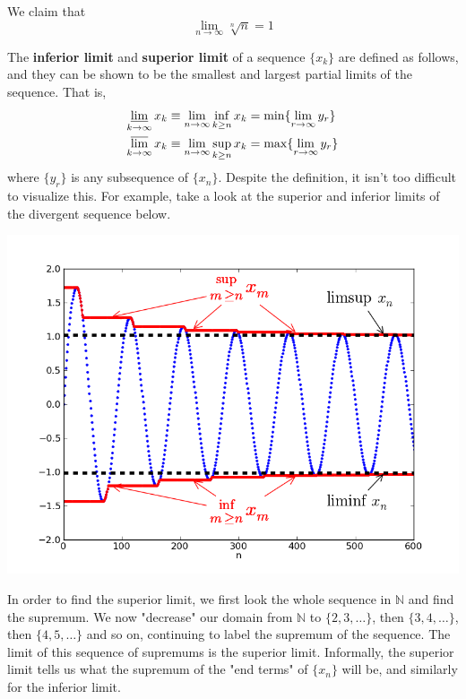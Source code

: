 \documentclass{article}
\begin{document}
    \begin{example}
      We claim that
      \begin{equation}
        \lim_{n\rightarrow \infty} \sqrt[n]{n} = 1
      \end{equation}
    \end{example}

    \begin{definition}
      The \textbf{inferior limit} and \textbf{superior limit} of a sequence $\{x_k\}$ are defined as follows, and they can be shown to be the smallest and largest partial limits of the sequence. That is, 
      \begin{align*}
        \varliminf_{k \rightarrow \infty} x_k & \equiv \lim_{n \rightarrow \infty} \inf_{k \geq n}{x_k} = \min\{ \lim_{r \rightarrow \infty} y_r\}\\
        \varlimsup_{k \rightarrow \infty} x_k & \equiv \lim_{n \rightarrow \infty} \sup_{k \geq n}{x_k} = \max\{ \lim_{r \rightarrow \infty} y_r\}
      \end{align*}
      where $\{y_r\}$ is any subsequence of $\{x_n\}$. Despite the definition, it isn't too difficult to visualize this. For example, take a look at the superior and inferior limits of the divergent sequence below.
      \begin{center}
        \includegraphics[scale=0.5]{img/Lim_sup_example.png}
      \end{center}
      In order to find the superior limit, we first look the whole sequence in $\mathbb{N}$ and find the supremum. We now "decrease" our domain from $\mathbb{N}$ to $\{2, 3, \ldots\}$, then $\{3, 4, \ldots\}$, then $\{4, 5, \ldots\}$ and so on, continuing to label the supremum of the sequence. The limit of this sequence of supremums is the superior limit. Informally, the superior limit tells us what the supremum of the "end terms" of $\{x_n\}$ will be, and similarly for the inferior limit. 


\end{definition}
\end{document}

